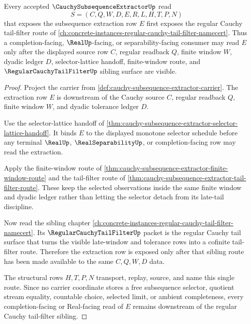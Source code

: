\begin{theorem}
\label{thm:cauchy-subsequence-extractor-tail-filter-sibling-route}
Every accepted $\CauchySubsequenceExtractorUp$ read
$$
S=(C,Q,W,D,E,R,L,H,T,P,N)
$$
that exposes the subsequence extraction row $E$ first exposes the regular Cauchy tail-filter route of \autoref{ch:concrete-instances-regular-cauchy-tail-filter-namecert}. Thus a completion-facing, $\RealUp$-facing, or separability-facing consumer may read $E$ only after the displayed source row $C$, regular readback $Q$, finite window $W$, dyadic ledger $D$, selector-lattice handoff, finite-window route, and $\RegularCauchyTailFilterUp$ sibling surface are visible.
\end{theorem}
\begin{proof}
Project the carrier from \autoref{def:cauchy-subsequence-extractor-carrier}. The extraction row $E$ is downstream of the Cauchy source $C$, regular readback $Q$, finite window $W$, and dyadic tolerance ledger $D$.

Use the selector-lattice handoff of \autoref{thm:cauchy-subsequence-extractor-selector-lattice-handoff}. It binds $E$ to the displayed monotone selector schedule before any terminal $\RealUp$, $\RealSeparabilityUp$, or completion-facing row may read the extraction.

Apply the finite-window route of \autoref{thm:cauchy-subsequence-extractor-finite-window-route} and the tail-filter route of \autoref{thm:cauchy-subsequence-extractor-tail-filter-route}. These keep the selected observations inside the same finite window and dyadic ledger rather than letting the selector detach from its late-tail discipline.

Now read the sibling chapter \autoref{ch:concrete-instances-regular-cauchy-tail-filter-namecert}. Its $\RegularCauchyTailFilterUp$ packet is the regular Cauchy tail surface that turns the visible late-window and tolerance rows into a cofinite tail-filter route. Therefore the extraction row is exposed only after that sibling route has been made available to the same $C,Q,W,D$ data.

The structural rows $H,T,P,N$ transport, replay, source, and name this single route. Since no carrier coordinate stores a free subsequence selector, quotient stream equality, countable choice, selected limit, or ambient completeness, every completion-facing or Real-facing read of $E$ remains downstream of the regular Cauchy tail-filter sibling.
\end{proof}
